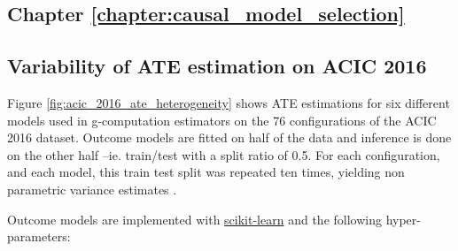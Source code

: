 \documentclass[french,12pt,twoside,a4paper]{book}
\begin{document}
\begin{appendices}
  \chapter{Chapter \ref{chapter:causal_model_selection}}\label{apd:causal_model_selection}


  \section{Variability of ATE estimation on ACIC 2016}%

  \label{apd:toy_example:acic_2016_ate_variability}%

  Figure \ref{fig:acic_2016_ate_heterogeneity} shows ATE estimations for six
  different models used in g-computation estimators on the 76 configurations of
  the ACIC 2016 dataset. Outcome models are fitted on half of the data and
  inference is done on the other half --ie. train/test with a split ratio of 0.5.
  For each configuration, and each model, this train test split was repeated ten
  times, yielding non parametric variance estimates
  \citep{bouthillier_accounting_2021}.

  Outcome models are implemented with
  \href{https://scikit-learn.org/stable/}{scikit-learn}
  \citep{pedregosa_scikitlearn_2011} and the following hyper-parameters:

  \begin{table}[h!]
    \centering
    \caption{Hyper-parameters grid used for ACIC 2016 ATE variability}
    \label{apd:toy_example:acic_2016_ate_variability:table}
  \end{table}



\end{appendices}
\end{document}
